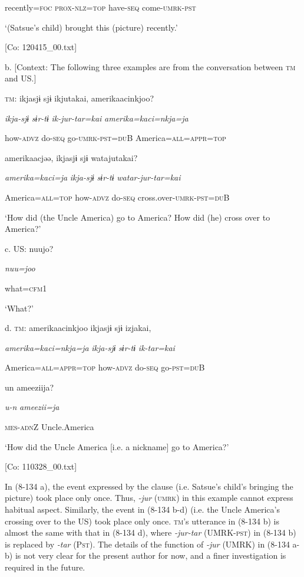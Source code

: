       recently=\textsc{foc}  \textsc{prox}-\textsc{nlz}=\textsc{top}  have-\textsc{seq}  come-\textsc{umrk}-\textsc{pst}

      ‘(Satsue’s child) brought this (picture) recently.’

      [Co: 120415\_00.txt]

  b.  [Context: The following three examples are from the conversation between \textsc{tm} and US.]

    \textsc{tm}:  ikjasjɨ  sjɨ  ikjutakai,  amerikaacinkjoo?

      \textit{ikja-sjɨ}  \textit{sɨr-tɨ}  \textit{ik-jur-tar=kai}  \textit{amerika=kaci=nkja=ja}

      how-\textsc{advz}  do-\textsc{seq}  go-\textsc{umrk}-\textsc{pst}=\textsc{du}B  America=\textsc{all}=\textsc{appr}=\textsc{top}

      amerikaacjəə,  ikjasjɨ  sjɨ  watajutakai?

      \textit{amerika=kaci=ja}  \textit{ikja-sjɨ}  \textit{sɨr-tɨ}  \textit{watar-jur-tar=kai}

      America=\textsc{all}=\textsc{top}  how-\textsc{advz}  do-\textsc{seq}  cross.over-\textsc{umrk}-\textsc{pst}=\textsc{du}B

      ‘How did (the Uncle America) go to America? How did (he) cross over to America?’

  c.  US:  nuujo?

      \textit{nuu=joo}

      what=\textsc{cfm}1

      ‘What?’

  d.  \textsc{tm}:  amerikaacinkjoo  ikjasjɨ  sjɨ  izjakai,

      \textit{amerika=kaci=nkja=ja}  \textit{ikja-sjɨ}  \textit{sɨr-tɨ}  \textit{ik-tar=kai}

      America=\textsc{all}=\textsc{appr}=\textsc{top}  how-\textsc{advz}  do-\textsc{seq}  go-\textsc{pst}=\textsc{du}B

      un  ameeziija?

      \textit{u-n}  \textit{ameezii=ja}

      \textsc{mes}-\textsc{adn}Z  Uncle.America

      ‘How did the Uncle America [i.e. a nickname] go to America?’

      [Co: 110328\_00.txt]

In (8-134 a), the event expressed by the clause (i.e. Satsue’s child’s bringing the picture) took place only once. Thus, \textit{{}-jur} (\textsc{umrk}) in this example cannot express habitual aspect. Similarly, the event in (8-134 b-d) (i.e. the Uncle America’s crossing over to the US) took place only once. \textsc{tm}’s utterance in (8-134 b) is almost the same with that in (8-134 d), where \textit{{}-jur-tar} (UMRK-\textsc{pst}) in (8-134 b) is replaced by \textit{{}-tar} (P\textsc{st}). The details of the function of \textit{{}-jur} (UMRK) in (8-134 a-b) is not very clear for the present author for now, and a finer investigation is required in the future.

